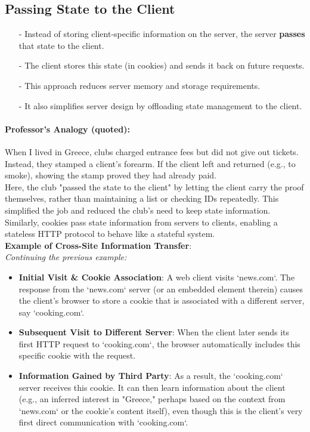 \documentclass[../../compsys.tex]{subfiles}
\begin{document}
\subsection{Passing State to the Client}
\begin{itemize}
    \item[-] Instead of storing client-specific information on the server, the server \textbf{passes} that state to the client.
    \item[-] The client stores this state (in cookies) and sends it back on future requests.
    \item[-] This approach reduces server memory and storage requirements.
    \item[-] It also simplifies server design by offloading state management to the client.
\end{itemize}

\paragraph{Professor's Analogy (quoted):} 

When I lived in Greece, clubs charged entrance fees but did not give out tickets. Instead, they stamped a client's forearm. If the client left and returned (e.g., to smoke), showing the stamp proved they had already paid.\\
Here, the club "passed the state to the client" by letting the client carry the proof themselves, rather than maintaining a list or checking IDs repeatedly. This simplified the job and reduced the club's need to keep state information.\\
\noindent
Similarly, cookies pass state information from servers to clients, enabling a stateless HTTP protocol to behave like a stateful system.\\
\textbf{Example of Cross-Site Information Transfer}:\\
\textit{Continuing the previous example:}
\begin{itemize}
    \item \textbf{Initial Visit \& Cookie Association}:
        A web client visits `news.com`. The response from the `news.com` server (or an embedded element therein) causes the client's browser to store a cookie that is associated with a different server, say `cooking.com`.

    \item \textbf{Subsequent Visit to Different Server}:
        When the client later sends its first HTTP request to `cooking.com`, the browser automatically includes this specific cookie with the request.

    \item \textbf{Information Gained by Third Party}:
        As a result, the `cooking.com` server receives this cookie. It can then learn information about the client (e.g., an inferred interest in "Greece," perhaps based on the context from `news.com` or the cookie's content itself), even though this is the client's very first direct communication with `cooking.com`.
\end{itemize}
\end{document}
